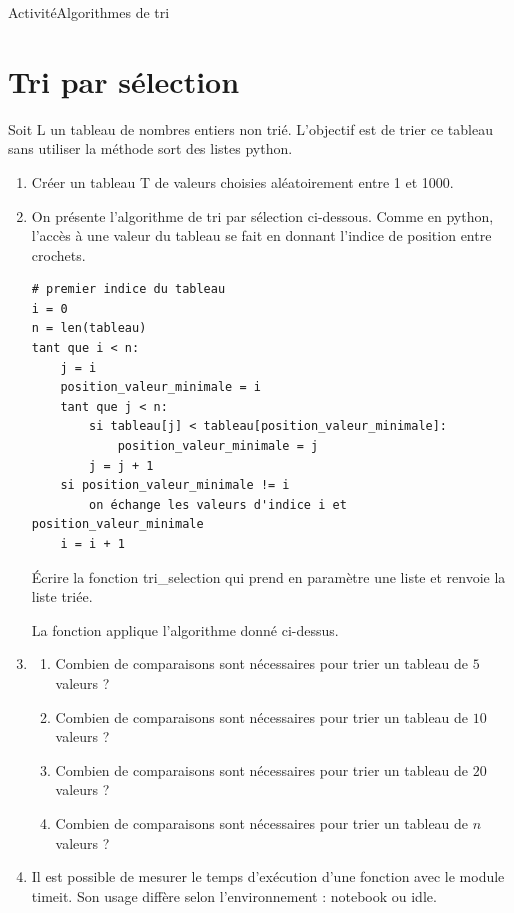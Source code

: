 \documentclass[11pt,a4paper]{article}
\begin{document}
\begin{NSI}
{Activité}{Algorithmes de tri}
\end{NSI}


\section*{Tri par sélection}

Soit \textsf{L} un tableau de nombres entiers non trié. L'objectif est de trier ce tableau sans utiliser la méthode \textsf{sort} des listes python.

\begin{enumerate}
\item Créer un tableau T de valeurs choisies aléatoirement entre 1 et 1000.
\item On présente l'algorithme de tri par sélection ci-dessous. Comme en python, l'accès à une valeur du tableau se fait en donnant l'indice de position entre crochets.

\begin{lstlisting}
# premier indice du tableau
i = 0
n = len(tableau)
tant que i < n:
	j = i
	position_valeur_minimale = i
	tant que j < n:
		si tableau[j] < tableau[position_valeur_minimale]:
			position_valeur_minimale = j
		j = j + 1
	si position_valeur_minimale != i
		on échange les valeurs d'indice i et position_valeur_minimale
	i = i + 1
\end{lstlisting}

Écrire la fonction \textsf{tri\_selection} qui prend en paramètre une liste et renvoie la liste triée.

La fonction applique l'algorithme donné ci-dessus.


\item \begin{enumerate}
\item Combien de comparaisons sont nécessaires pour trier un tableau de $5$ valeurs ?
\item Combien de comparaisons sont nécessaires pour trier un tableau de $10$ valeurs ?
\item Combien de comparaisons sont nécessaires pour trier un tableau de $20$ valeurs ?
\item Combien de comparaisons sont nécessaires pour trier un tableau de $n$ valeurs ?
\end{enumerate}

\item Il est possible de mesurer le temps d'exécution d'une fonction avec le module \textsf{timeit}. Son usage diffère selon l'environnement : notebook ou idle.


\end{enumerate}
\end{document}
